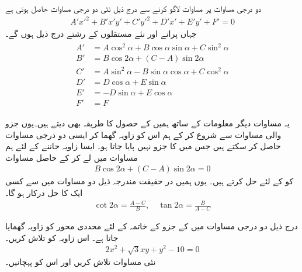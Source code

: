 دو درجی مساوات  پر مساوات  لاگو کرنے سے درج ذیل نئی دو درجی مساوات حاصل ہوتی ہے
\begin{align}\label{مساوات_مخروط_گھمانے_کے_بعد}
A'x'^2+B'x'y'+C'y'^2+D'x'+E'y'+F'=0
\end{align}
جہاں پرانے اور نئے مستقلوں کے رشتے درج ذیل ہوں گے۔
\begin{gather}
\begin{aligned}\label{مساوات_مخروط_گھما_کر_مستقل_کے_تعلق}
A'&=A\cos^2\alpha+B\cos\alpha\sin\alpha+C\sin^2\alpha\\
B'&=B\cos2\alpha+(C-A)\sin2\alpha\\
C'&=A\sin^2\alpha-B\sin\alpha\cos\alpha+C\cos^2\alpha\\
D'&=D\cos\alpha+E\sin\alpha\\
E'&=-D\sin\alpha+E\cos\alpha\\
F'&=F
\end{aligned}
\end{gather}

یہ مساوات دیگر معلومات کے ساتھ ہمیں  کے حصول کا طریقہ بھی دیتے ہیں۔یوں  جزو والی مساوات سے شروع کر کے ہم اس کو  زاویہ  گھما کر ایسی دو درجی مساوات حاصل کر سکتے ہیں جس میں  کا جزو نہیں پایا جاتا ہو۔ ایسا زاویہ جاننے کے لئے ہم مساوات  میں  لے کر  کے حاصل مساوات
\begin{align*}
B\cos2\alpha+(C-A)\sin2\alpha=0
\end{align*}
کو   کے لئے حل کرتے ہیں۔ یوں ہمیں در حقیقت مندرجہ ذیل دو مساوات میں سے کسی ایک کا حل درکار ہو گا۔
\begin{align}\label{مساوات_مخروط_زاویہ_جو_سادہ_مساوات_دیگا}
\cot 2\alpha=\frac{A-C}{B},\quad \tan2\alpha=\frac{B}{A-C}
\end{align} 

درج ذیل دو درجی مساوات میں  کے جزو کے خاتمہ کے لئے محددی محور کو زاویہ  گھمایا جاتا ہے۔ اس زاویہ کو تلاش کریں۔
\begin{align*}
2x^2+\sqrt{3}xy+y^2-10=0
\end{align*}
نئی مساوات تلاش کریں اور اس کو پہچانیں۔

